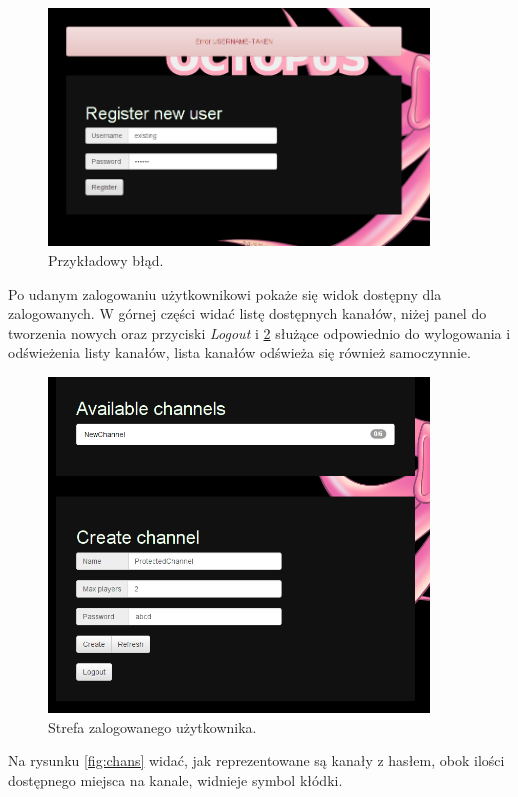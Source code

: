 \begin{figure}[h]
    \centering
    \includegraphics[width=0.9\textwidth]{imgs/error.png}
    \caption{Przykładowy błąd.}
    \label{fig:error-example}
\end{figure}
\clearpage
Po udanym zalogowaniu użytkownikowi pokaże się widok dostępny dla zalogowanych. W górnej części widać listę dostępnych kanałów, niżej panel do tworzenia nowych oraz przyciski \emph{Logout} i \ref{fig:zone} służące odpowiednio do wylogowania i odświeżenia listy kanałów, lista kanałów odświeża się również samoczynnie.

\begin{figure}[h]
    \centering
    \includegraphics[width=0.9\textwidth]{imgs/beforeCreation.png}
    \caption{Strefa zalogowanego użytkownika.}
    \label{fig:zone}
\end{figure}
\clearpage
Na rysunku \ref{fig:chans} widać, jak reprezentowane są kanały z hasłem, obok ilości dostępnego miejsca na kanale, widnieje symbol kłódki.


